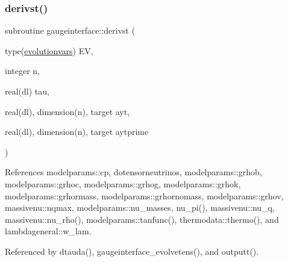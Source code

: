 \subsubsection{\texorpdfstring{derivst()}{derivst()}}
{\footnotesize\ttfamily subroutine gaugeinterface\+::derivst (\begin{DoxyParamCaption}\item[{type(\mbox{\hyperlink{structgaugeinterface_1_1evolutionvars}{evolutionvars}})}]{EV,  }\item[{integer}]{n,  }\item[{real(dl)}]{tau,  }\item[{real(dl), dimension(n), target}]{ayt,  }\item[{real(dl), dimension(n), target}]{aytprime }\end{DoxyParamCaption})}



References modelparams\+::cp, dotensorneutrinos, modelparams\+::grhob, modelparams\+::grhoc, modelparams\+::grhog, modelparams\+::grhok, modelparams\+::grhormass, modelparams\+::grhornomass, modelparams\+::grhov, massivenu\+::nqmax, modelparams\+::nu\+\_\+masses, nu\+\_\+pi(), massivenu\+::nu\+\_\+q, massivenu\+::nu\+\_\+rho(), modelparams\+::tanfunc(), thermodata\+::thermo(), and lambdageneral\+::w\+\_\+lam.



Referenced by dtauda(), gaugeinterface\+\_\+evolvetens(), and outputt().

